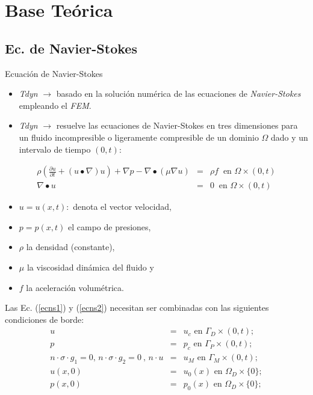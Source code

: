 \documentclass[spanish]{beamer}
\begin{document}
\section{Base Teórica}
%
	\subsection{Ec. de Navier-Stokes}
		\begin{frame}{Ecuación de Navier-Stokes}
		\begin{itemize}
\item \emph{Tdyn} $\rightarrow$ basado en la solución numérica de las ecuaciones de \emph{Navier-Stokes} empleando el \emph{FEM}.		
\item \emph{Tdyn} $\rightarrow$ resuelve las ecuaciones de Navier-Stokes en tres dimensiones para un fluido incompresible o ligeramente compresible de un dominio $\Omega$ dado y un intervalo de tiempo $(0,t):$
		\end{itemize}
	\end{frame}
	\begin{frame}
\begin{eqnarray}
\label{ecns1}
\rho \left(\frac{\partial u}{\partial t}+\left( u \bullet  \nabla \right)u \right)+ \nabla p - \nabla \bullet(\mu \nabla u) &=& \rho f~ \mbox{ en  }\Omega \times (0,t)\\
\nabla \bullet u&=&0 ~ \mbox{ en  } \Omega \times (0,t)
\label{ecns2}
\end{eqnarray}
\begin{itemize}
\item $u = u(x,t):$ denota el vector velocidad,
\item $p=p(x,t)$ el campo de presiones, 
\item $\rho$ la densidad (constante), 
\item $\mu$ la viscosidad dinámica del fluido y 
\item $f$ la aceleración volumétrica.
\end{itemize}
\end{frame}
%
\begin{frame}
Las Ec. (\ref{ecns1}) y (\ref{ecns2}) necesitan ser combinadas con las siguientes condiciones de borde:
\begin{eqnarray}
u &=& u_c \mbox{ en  } \Gamma_D \times (0,t);\\
p &=& p_c \mbox{ en  } \Gamma_P \times (0,t);\\
n \cdot \sigma \cdot g_1=0 \mbox{, } n \cdot \sigma \cdot g_2=0~ \mbox{, } n \cdot u&=&u_M \mbox{ en  } \Gamma_M \times (0,t);\\
u(x,0)&=&u_0(x) \mbox{ en  } \Omega_D \times \lbrace 0 \rbrace ;\\
p(x,0)&=&p_0(x) \mbox{ en  } \Omega_D \times \lbrace 0 \rbrace ;
\end{eqnarray}
\end{frame}
\end{document}

